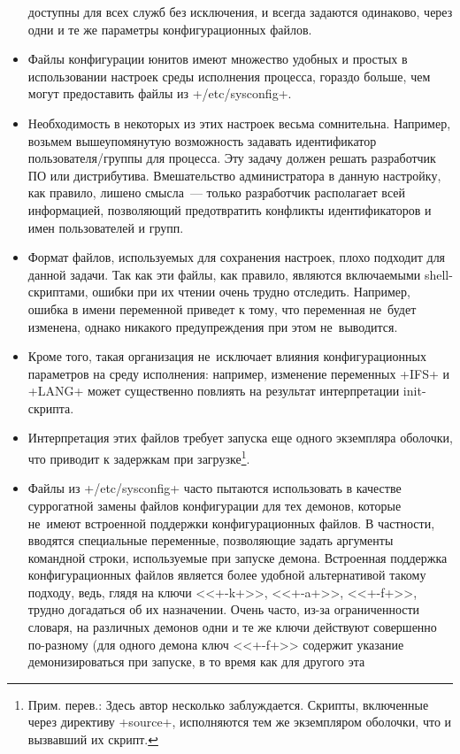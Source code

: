 \documentclass[10pt,oneside,a4paper]{article}
\begin{document}
\begin{itemize}
		доступны для всех служб без исключения, и всегда задаются
		одинаково, через одни и те же параметры конфигурационных файлов.
	\item Файлы конфигурации юнитов имеют множество удобных и простых в
		использовании настроек среды исполнения процесса, гораздо
		больше, чем могут предоставить файлы из +/etc/sysconfig+.
	\item Необходимость в некоторых из этих настроек весьма сомнительна.
		Например, возьмем вышеупомянутую возможность задавать
		идентификатор пользователя/группы для процесса. Эту задачу
		должен решать разработчик ПО или дистрибутива. Вмешательство
		администратора в данную настройку, как правило, лишено
		смысла~--- только разработчик располагает всей информацией,
		позволяющий предотвратить конфликты идентификаторов и имен
		пользователей и групп.
	\item Формат файлов, используемых для сохранения настроек, плохо
		подходит для данной задачи. Так как эти файлы, как правило,
		являются включаемыми shell-скриптами, ошибки при их чтении очень
		трудно отследить. Например, ошибка в имени переменной приведет к
		тому, что переменная не~будет изменена, однако никакого
		предупреждения при этом не~выводится.
	\item Кроме того, такая организация не~исключает влияния
		конфигурационных параметров на среду исполнения: например,
		изменение переменных +IFS+ и +LANG+ может существенно повлиять
		на результат интерпретации init-скрипта.
	\item Интерпретация этих файлов требует запуска еще одного экземпляра
		оболочки, что приводит к задержкам при загрузке\footnote{Прим.
		перев.: Здесь автор несколько заблуждается. Скрипты, включенные
		через директиву +source+, исполняются тем же экземпляром
		оболочки, что и вызвавший их скрипт.}.
	\item Файлы из +/etc/sysconfig+ часто пытаются использовать в качестве
		суррогатной замены файлов конфигурации для тех демонов, которые
		не~имеют встроенной поддержки конфигурационных файлов. В
		частности, вводятся специальные переменные, позволяющие задать
		аргументы командной строки, используемые при запуске демона.
		Встроенная поддержка конфигурационных файлов является более
		удобной альтернативой такому подходу, ведь, глядя на ключи
		<<+-k+>>, <<+-a+>>, <<+-f+>>, трудно догадаться об их
		назначении. Очень часто, из-за ограниченности словаря, на
		различных демонов одни и те же ключи действуют совершенно
		по-разному (для одного демона ключ <<+-f+>> содержит указание
		демонизироваться при запуске, в то время как для другого эта

\end{itemize}
\end{document}
